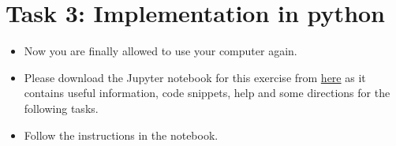 \documentclass{article}
\begin{document}
\section*{Task 3: Implementation in python}
\begin{itemize}
    \item Now you are finally allowed to use your computer again.
    \item Please download the Jupyter notebook for this exercise from \href{https://github.com/DataScienceLabFHSWF/MachineLearningCourse/tree/main/notebooks/06}{here} as it contains useful information, code snippets, help and some directions for the following tasks.
    \item Follow the instructions in the notebook. 
\end{itemize}

%
%
\end{document}
